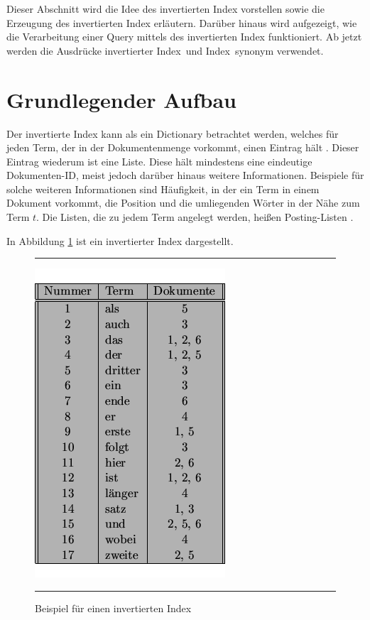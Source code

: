 Dieser Abschnitt wird die Idee des invertierten Index vorstellen sowie die Erzeugung des invertierten Index erläutern. Darüber hinaus wird aufgezeigt, wie die Verarbeitung einer Query mittels des invertierten Index funktioniert. Ab jetzt werden die Ausdrücke \glqq invertierter Index\grqq\ und \glqq Index\grqq\ synonym verwendet.
\section{Grundlegender Aufbau}
Der invertierte Index kann als ein Dictionary betrachtet werden, welches für jeden Term, der in der Dokumentenmenge vorkommt, einen Eintrag hält \cite[S. 6 f.]{IR_Intro_Cambridge} \cite{IR_Uni_Bamberg}. Dieser Eintrag wiederum ist eine Liste. Diese hält mindestens eine eindeutige Dokumenten-ID, meist jedoch darüber hinaus weitere Informationen. Beispiele für solche weiteren Informationen sind Häufigkeit, in der ein Term in einem Dokument vorkommt, die Position und die umliegenden Wörter in der Nähe zum Term $t$.
Die Listen, die zu jedem Term angelegt werden, heißen Posting-Listen \cite[S. 6]{IR_Intro_Cambridge}.

In Abbildung \ref{fig:invIndex} ist ein invertierter Index dargestellt.
\begin{figure}
	\centering
	\rule{\textwidth}{0.4pt}
	\includegraphics[scale=0.5]{../Abbildungen/index.png}
	\rule{\textwidth}{0.4pt}
	\caption{Beispiel für einen invertierten Index \cite{index_Uni_Munich}}
	\label{fig:invIndex}
\end{figure}


